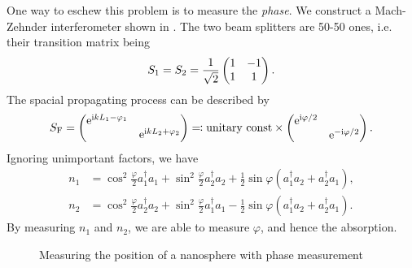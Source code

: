 \documentclass[hyperref, a4paper]{article}
\newcommand*{\ii}{\mathrm{i}}
\newcommand*{\ee}{\mathrm{e}}
\begin{document}
One way to eschew this problem is to measure the \emph{phase}. We construct a Mach-Zehnder interferometer shown in .
The two beam splitters are 50-50 ones, i.e. their transition matrix being 
\begin{equation}
    S_1 = S_2 = \frac{1}{\sqrt{2}} \pmqty{ 1 & -1 \\ 1 & 1 }.
\end{equation}
The spacial propagating process can be described by 
\begin{equation}
    S_\text{F} = \pmqty{\dmat{\ee^{\ii k L_1 - \varphi_1}, \ee^{\ii k L_2 + \varphi_2}}} \eqqcolon \text{unitary const} \times \pmqty{\dmat{\ee^{\ii \varphi / 2}, \ee^{- \ii \varphi / 2}}}.
\end{equation}
Ignoring unimportant factors, we have 
\begin{equation}
    \begin{aligned}
        n_1 &= \cos^2\frac{\varphi}{2} a_1^\dagger a_1 + \sin^2\frac{\varphi}{2} a_2^\dagger a_2 + \frac{1}{2} \sin \varphi (a_1^\dagger a_2 + a^\dagger_2 a_1), \\
        n_2 &= \cos^2\frac{\varphi}{2} a_2^\dagger a_2 + \sin^2\frac{\varphi}{2} a_1^\dagger a_1 - \frac{1}{2} \sin \varphi (a_1^\dagger a_2 + a^\dagger_2 a_1).
    \end{aligned}
\end{equation}
By measuring $n_1$ and $n_2$, we are able to measure $\varphi$, and hence the absorption.

\begin{figure}
    \centering
    
    \caption{Measuring the position of a nanosphere with phase measurement}
    \label{fig:nanosphere}
\end{figure}
\end{document}
